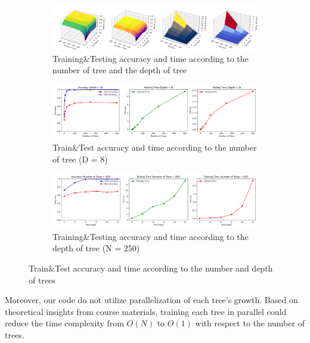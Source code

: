 \begin{figure}
	\centering
	\begin{subfigure}[H]{\linewidth}
		\centering
		\includegraphics[width=\linewidth]{image/q2-fig1-1.png}
		\caption{Training\&Testing accuracy and time according to the number of tree and the depth of tree}
		\label{fig:q2-fig1}
	\end{subfigure}
	\begin{subfigure}[H]{\linewidth}
		\centering
		\includegraphics[width=0.8\linewidth]{image/q2-fig2.png}
		\caption{Train\&Test accuracy and time according to the number of tree (D = 8)}
		\label{fig:q2-fig2}
	\end{subfigure}
	\begin{subfigure}[H]{\linewidth}
		\centering
		\includegraphics[width=0.8\linewidth]{image/q2-fig3.png}
		\caption{Training\&Testing accuracy and time according to the depth of tree (N = 250)}
		\label{fig:q2-fig3}
	\end{subfigure}
	\caption{Train\&Test accuracy and time according to the number and depth of trees}
\end{figure}
\noindent
Moreover, our code do not utilize parallelization of each tree's growth. Based on theoretical insights from course materials, training each tree in parallel could reduce the time complexity from $O(N)$ to $O(1)$ with respect to the number of trees.


